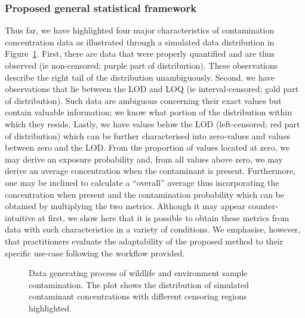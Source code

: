 \documentclass[
]{article}
\begin{document}
\subsubsection{Proposed general statistical
framework}\label{proposed-general-statistical-framework}

Thus far, we have highlighted four major characteristics of
contamination concentration data as illustrated through a simulated data
distribution in Figure~\ref{fig-datagen}. First, there are data that
were properly quantified and are thus observed (ie non-censored; purple
part of distribution). These observations describe the right tail of the
distribution unambiguously. Second, we have observations that lie
between the LOD and LOQ (ie interval-censored; gold part of
distribution). Such data are ambiguous concerning their exact values but
contain valuable information; we know what portion of the distribution
within which they reside. Lastly, we have values below the LOD
(left-censored; red part of distribution) which can be further
characterised into zero-values and values between zero and the LOD. From
the proportion of values located at zero, we may derive an exposure
probability and, from all values above zero, we may derive an average
concentration when the contaminant is present. Furthermore, one may be
inclined to calculate a ``overall'' average thus incorporating the
concentration when present and the contamination probability which can
be obtained by multiplying the two metrics. Although it may appear
counter-intuitive at first, we show here that it is possible to obtain
these metrics from data with such characteristics in a variety of
conditions. We emphasise, however, that practitioners evaluate the
adaptability of the proposed method to their specific use-case following
the workflow provided.

\label{cell-fig-datagen}
\begin{figure}[H]


\caption{\label{fig-datagen}Data generating process of wildlife and
environment sample contamination. The plot shows the distribution of
simulated contaminant concentrations with different censoring regions
highlighted.}

\end{figure}%
\end{document}
